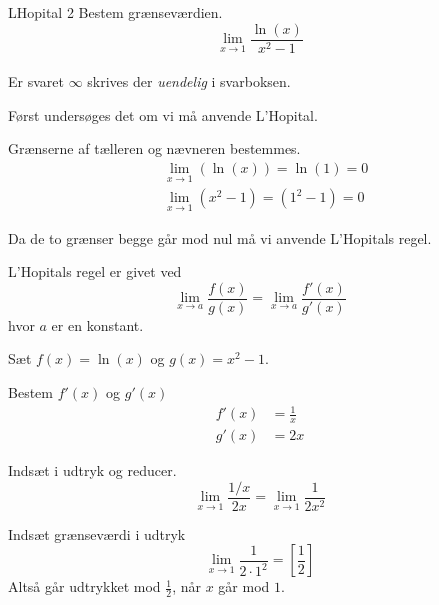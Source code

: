 \documentclass{article}
\begin{document}
\begin{exercise}{LHopital 2}
	Bestem grænseværdien.
	\[
	\lim_{x \to 1} \frac{\ln(x)}{x^2 - 1}
	\] 
	\\
	Er svaret $\infty$ skrives der \emph{uendelig} i svarboksen.
	
	
	\hint
	Først undersøges det om vi må anvende L'Hopital.
	
	\hint
	Grænserne af tælleren og nævneren bestemmes.
	\begin{align*}
		&\lim_{x \to 1} (\ln(x)) = \ln(1) = 0 \\
		&\lim_{x \to 1} (x^2 - 1) = (1^2 - 1) = 0
	\end{align*}
	
	\hint
	Da de to grænser begge går mod nul må vi  anvende L'Hopitals regel. 
	
	\hint
	L'Hopitals regel er givet ved
	\[
	\lim_{x \to a} \frac{f(x)}{g(x)} = \lim_{x \to a} \frac{f'(x)}{g'(x)} 
	\]
	hvor $a$  er en konstant.
	
	\hint
	Sæt $f(x) = \ln(x)$ og $g(x) = x^2-1$. 
	
	\hint
	Bestem $f'(x)$ og $g'(x)$
	\begin{align*}
		f'(x) &= \frac{1}{x} \\
		g'(x) &= 2x
	\end{align*}
	
	\hint
	Indsæt i udtryk og reducer. 
	\[
	\lim_{x \to 1} \frac{1/x}{2x} = \lim_{x \to 1} \frac{1}{2x^2} 
	\]
	
	\hint
	Indsæt grænseværdi i udtryk
	\[
	\lim_{x \to 1} \frac{1}{2 \cdot 1^2}  = \left[ \frac{1}{2}  \right] 
	\]
	Altså går udtrykket mod $\frac{1}{2}$, når $x$ går mod $1$. 
			
\end{exercise}
\end{document}
